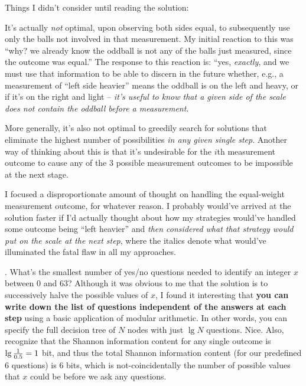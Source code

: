 \documentclass[11pt]{article}
\begin{document}
Things I didn't consider until reading the solution:
\begin{compactitem}
	\item It's actually \textit{not} optimal, upon observing both sides equal, to subsequently use only the balls not involved in that measurement. My initial reaction to this was ``why? we already know the oddball is not any of the balls just measured, since the outcome was equal.'' The response to this reaction is: ``yes, \textit{exactly}, and we must use that information to be able to discern in the future whether, e.g., a measurement of ``left side heavier'' means the oddball is on the left and heavy, or if it's on the right and light -- \textit{it's useful to know that a given side of the scale does not contain the oddball before a measurement}.
	
	\item More generally, it's also not optimal to greedily search for solutions that eliminate the highest number of possibilities \textit{in any given single step}. Another way of thinking about this is that it's undesirable for the $i$th measurement outcome to cause any of the 3 possible measurement outcomes to be impossible at the next stage.
	
	\item I focused a disproportionate amount of thought on handling the equal-weight measurement outcome, for whatever reason. I probably would've arrived at the solution faster if I'd actually thought about how my strategies would've handled some outcome being ``left heavier'' and \textit{then considered what that strategy would put on the scale at the next step}, where the italics denote what would've illuminated the fatal flaw in all my approaches. 
\end{compactitem}


\myspace
\p {}. What's the smallest number of yes/no questions needed to identify an integer $x$ between 0 and 63? Although it was obvious to me that the solution is to successively halve the possible values of $x$, I found it interesting that \textbf{you can write down the list of questions independent of the answers at each step} using a basic application of modular arithmetic. In other words, you can specify the full decision tree of $N$ nodes with just $\lg N$ questions. Nice. Also, recognize that the Shannon information content for any single outcome is $\lg\frac{1}{0.5} = 1$ bit, and thus the total Shannon information content (for our predefined 6 questions) is 6 bits, which is not-coincidentally the number of possible values that $x$ could be before we ask any questions.\\
\end{document}
